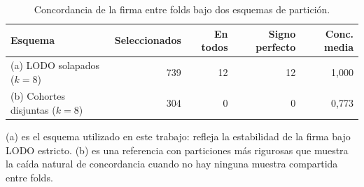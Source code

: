 \begin{table}[H]
  \centering
  \small
  \caption{Concordancia de la firma entre folds bajo dos esquemas de
  partición.}
  \label{tab:folds}
  \begin{tabular}{lrrrr}
    \toprule
    \textbf{Esquema} & \textbf{Seleccionados} & \textbf{En todos} & \textbf{Signo perfecto} & \textbf{Conc. media} \\
    \midrule
    (a) LODO solapados ($k{=}8$)  & 739 & 12 & 12 & 1,000 \\
    (b) Cohortes disjuntas ($k{=}8$) & 304 & 0 & 0 & 0,773 \\
    \bottomrule
  \end{tabular}

  \vspace{0.35em}
  {\footnotesize (a) es el esquema utilizado en este trabajo: refleja la
  estabilidad de la firma bajo LODO estricto. (b) es una referencia con
  particiones más rigurosas que muestra la caída natural de concordancia
  cuando no hay ninguna muestra compartida entre folds.}
\end{table}
